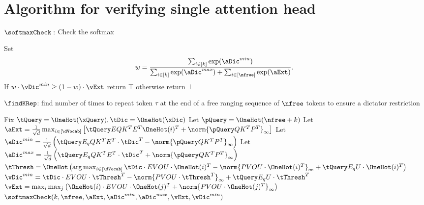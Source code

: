 \section{Algorithm for verifying single attention head}

\begin{algorithm}[H]
	\caption{$\softmaxCheck:$ Check the softmax}
	Set
	\[
		w = \frac{\sum_{i\in [k]} \exp(\aDic^{min})}{\sum_{i \in [k]} \exp(\aDic^{max}) +
		\sum_{i \in [\nfree]} \exp(\aExt)}.\;
	\]
	If $w \cdot \vDic^{min} \geq (1 - w) \cdot \vExt$ return $\top$ otherwise return $\bot$ \;
\end{algorithm}

\begin{algorithm}[H]
	\caption{$\findKRep$: find number of times to repeat token $\tau$ at the end of a free ranging sequence of $\nfree$ tokens to ensure a dictator restriction  }
	\KwData{$\xQuery, \xDic, \nfree, \klen$}
	Fix $\tQuery = \OneHot(\xQuery), \tDic = \OneHot(\xDic)$	\;
	Let $\pQuery = \OneHot(\nfree + k)$\;
	Let $\aExt = \frac{1}{\sqrt{d}} \max_{i \in [\dVocab]} \left[\tQuery EQK^T E^T \OneHot(i)^T + \norm{\pQuery QK^TP^T}_\infty \right]$ \;
	Let $\aDic^{min} = \frac{1}{\sqrt{d}} \left(\tQuery E_q QK^T E^T \cdot \tDic^T - \norm{\pQuery QK^TP^T}_\infty \right)$ \;
	Let $\aDic^{max} = \frac{1}{\sqrt{d}} \left(\tQuery E_q QK^T E^T \cdot \tDic^T + \norm{\pQuery QK^TP^T}_\infty \right)$ \;
	$\tThresh = \OneHot\left(\arg \max_{i \in [\dVocab]} \tDic \cdot EVOU \cdot \OneHot(i)^T - \norm{PVOU \cdot \OneHot(i)^T}_\infty + \tQuery E_q U \cdot \OneHot(i)^T \right)$ \;
	\;
	$\vDic^{min} = \tDic \cdot EVOU \cdot \tThresh^T - \norm{PVOU \cdot \tThresh^T}_\infty + \tQuery E_qU \cdot \tThresh^T$\;
	$\vExt = \max_i \max_j \left(\OneHot(i) \cdot EVOU \cdot \OneHot(j)^T + \norm{PVOU \cdot \OneHot(j)^T}_\infty\right)$\;
	\Return $\softmaxCheck(k, \nfree, \aExt, \aDic^{min}, \aDic^{max}, \vExt, \vDic^{min})$\;
\end{algorithm}

